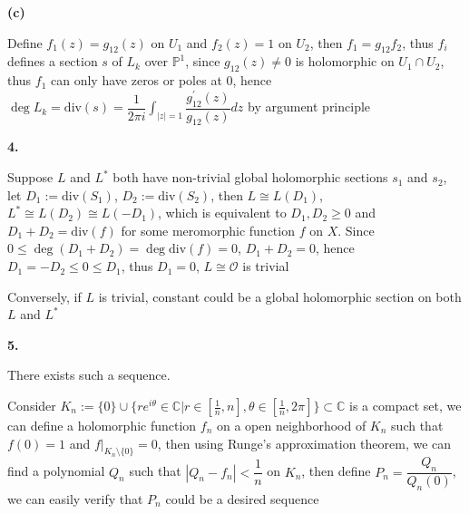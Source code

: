 \documentclass[12pt]{article}
\begin{document}
\textbf{(c)} \par
Define $f_{1}(z)=g_{12}(z)$ on $U_{1}$ and $f_{2}(z)=1$ on $U_{2}$, then $f_{1}=g_{12}f_{2}$, thus $f_{i}$ defines a section $s$ of $L_{k}$ over $\mathbb{P}^{1}$, since $g_{12}(z)\neq 0$ is holomorphic on $U_{1}\cap U_{2}$, thus $f_{1}$ can only have zeros or poles at $0$, hence $\deg L_{k}=\mathrm{div}(s)=\dfrac{1}{2\pi i}\displaystyle{\int_{|z|=1}}\dfrac{g_{12}^{'}(z)}{g_{12}(z)}dz$ by argument principle \par
\textbf{4.} \par
Suppose $L$ and $L^{*}$ both have non-trivial global holomorphic sections $s_{1}$ and $s_{2}$, let $D_{1}:=\mathrm{div}(S_{1})$, $D_{2}:=\mathrm{div}(S_{2})$, then $L\cong L(D_{1})$, $L^{*}\cong L(D_{2})\cong L(-D_{1})$, which is equivalent to $D_{1},D_{2}\geq 0$ and $D_{1}+D_{2}=\mathrm{div}(f)$ for some meromorphic function $f$ on $X$. Since $0\leq\deg(D_{1}+D_{2})=\deg\mathrm{div}(f)=0$, $D_{1}+D_{2}=0$, hence $D_{1}=-D_{2}\leq0\leq D_{1}$, thus $D_{1}=0$, $L\cong \mathcal{O}$ is trivial \par
Conversely, if $L$ is trivial, constant could be a global holomorphic section on both $L$ and $L^{*}$ \par
\textbf{5.} \par
There exists such a sequence. \par
Consider $K_{n}:=\{0\}\cup\{re^{i\theta}\in\mathbb{C}|r\in[\frac{1}{n},n], \theta\in[\frac{1}{n},2\pi]\}\subset\mathbb{C}$ is a compact set, we can define a holomorphic function $f_{n}$ on a open neighborhood of $K_n$ such that $f(0)=1$ and $f|_{K_n\setminus\{0\}}=0$, then using Runge's approximation theorem, we can find a polynomial $Q_{n}$ such that $|Q_n-f_n|<\dfrac{1}{n}$ on $K_n$, then define $P_n=\dfrac{Q_n}{Q_n(0)}$, we can easily verify that $P_n$ could be a desired sequence
\end{document}
